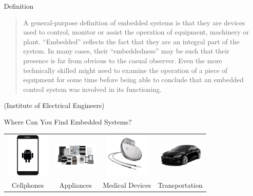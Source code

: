 \documentclass{beamer}
\begin{document}
	\begin{frame}{Definition}

		\begin{center}
			\begin{quote}
				A general-purpose definition of embedded systems is that they are
				devices used to control, monitor or assist the operation of equipment,
				machinery or plant. “Embedded” reflects the fact that they are an
				integral part of the system. In many cases, their “embeddedness” may
				be such that their presence is far from obvious to the casual observer.
				Even the more technically skilled might need to examine the operation
				of a piece of equipment for some time before being able to conclude
				that an embedded control system was involved in its functioning.
			\end{quote}
		\end{center}
		
		\begin{flushright}			
			(Institute of Electrical Engineers)
		\end{flushright}	
		
	\end{frame}  
	
	\begin{frame}{Where Can You Find Embedded Systems?}
		\begin{tabular}{c c c c}		
			\includegraphics[width=6em]{img/phone-icon-android-phone.png} &
			\includegraphics[width=6em]{img/appliances.png} &
			\includegraphics[width=6em]{img/Permanent-Pacemaker.png} &
			\includegraphics[width=6em]{img/must_diagonaal1.png} \\
			\tiny{Cellphones} &
			\tiny{Appliances} &
			\tiny{Medical Devices} &
			\tiny{Transportation}
		\end{tabular}
	\end{frame}
	
\end{document}
